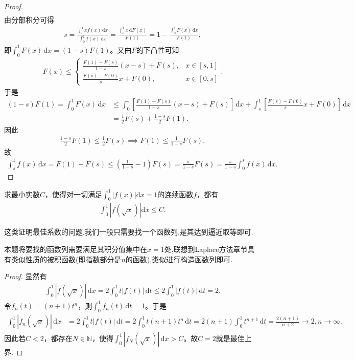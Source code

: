 \documentclass[../../main.tex]{subfiles}%
\begin{document}
\begin{proof}
\begin{align*}
\end{align*}
由分部积分可得
\begin{align*}
s = \frac{\int_0^1 x f(x) \, \mathrm{d}x}{\int_0^1 f(x) \, \mathrm{d}x} = \frac{\int_0^1 x \, \mathrm{d}F(x)}{F(1)} = 1 - \frac{\int_0^1 F(x) \, \mathrm{d}x}{F(1)},
\end{align*}
即$\int_0^1 F(x) \, \mathrm{d}x = (1 - s) F(1)$。又由$F$的下凸性可知
\begin{align*}
F(x) \leqslant  
\begin{cases}
\frac{F(1) - F(s)}{1 - s}(x - s) + F(s), & x \in [s,1] \\
\frac{F(s) - F(0)}{s}x + F(0), & x \in [0,s]
\end{cases}.
\end{align*}
于是
\begin{align*}
(1 - s) F(1) = \int_0^1 F(x) \, \mathrm{d}x &\leqslant  \int_0^s \left[ \frac{F(1) - F(s)}{1 - s}(x - s) + F(s) \right] \, \mathrm{d}x + \int_s^1 \left[ \frac{F(s) - F(0)}{s}x + F(0) \right] \, \mathrm{d}x \\
&= \frac{1}{2} F(s) + \frac{1 - s}{2} F(1).
\end{align*}
因此
\begin{align*}
\frac{1 - s}{2} F(1) \leqslant  \frac{1}{2} F(s) \implies F(1) \leqslant  \frac{1}{1 - s} F(s),
\end{align*}
故
\begin{align*}
\int_s^1 f(x) \, \mathrm{d}x = F(1) - F(s) \leqslant  \left( \frac{1}{1 - s} - 1 \right) F(s) = \frac{s}{1 - s} F(s) = \frac{s}{1 - s} \int_0^s f(x) \, \mathrm{d}x.
\end{align*}
\end{proof}

\begin{example}
求最小实数$C$，使得对一切满足$\int_{0}^{1}|f(x)|\mathrm{d}x = 1$的连续函数$f$，都有
\begin{align*}
\int_{0}^{1}|f(\sqrt{x})|\mathrm{d}x \leqslant C.
\end{align*}
\end{example}
\begin{remark}
这类证明最佳系数的问题,我们一般只需要找一个函数列,是其达到逼近取等即可.

本题将要找的函数列需要满足其积分值集中在$x=1$处,联想到Laplace方法章节具有类似性质的被积函数(即指数部分是$n$的函数),类似进行构造函数列即可.
\end{remark}
\begin{proof}
显然有
\begin{align*}
\int_0^1 |f(\sqrt{x})| \, \mathrm{d}x = 2 \int_0^1 t |f(t)| \, \mathrm{d}t \leqslant 2 \int_0^1 |f(t)| \, \mathrm{d}t = 2.
\end{align*}
令$f_n(t) = (n+1) t^n$，则$\int_0^1 f_n(t) \, \mathrm{d}t = 1$。于是
\begin{align*}
\int_0^1 |f_n(\sqrt{x})| \, \mathrm{d}x &= 2 \int_0^1 t |f(t)| \, \mathrm{d}t = 2 \int_0^1 t (n+1) t^n \, \mathrm{d}t 
= 2 (n+1) \int_0^1 t^{n+1} \, \mathrm{d}t = \frac{2(n+1)}{n+2} \to 2, n \to \infty.
\end{align*}
因此若$C < 2$，都存在$N \in \mathbb{N}$，使得$\int_0^1 |f_N(\sqrt{x})| \, \mathrm{d}x > C$。故$C = 2$就是最佳上界.
\end{proof}
\end{document}
